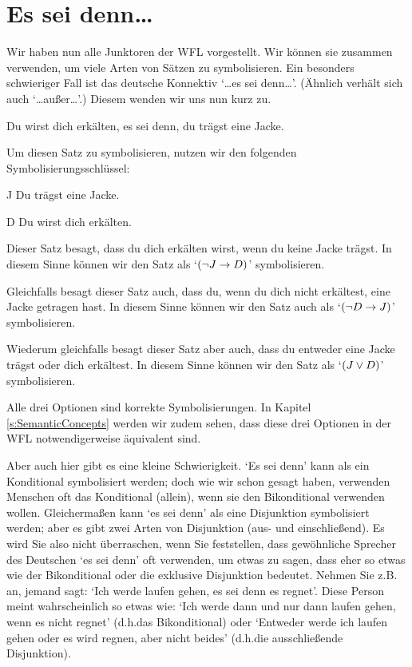 \section{Es sei denn\dots}
Wir haben nun alle Junktoren der WFL vorgestellt. Wir können sie zusammen verwenden, um viele Arten von Sätzen zu symbolisieren. Ein besonders schwieriger Fall ist das deutsche Konnektiv `\dots es sei denn\dots'. (Ähnlich verhält sich auch `\dots au{\ss}er\dots'.) Diesem wenden wir uns nun kurz zu. 

\begin{earg}
\item[\ex{unless1}] Du wirst dich erkälten, es sei denn, du trägst eine Jacke.
\end{earg}
Um diesen Satz zu symbolisieren, nutzen wir den folgenden Symbolisierungsschlüssel:
	\begin{ekey}
		\item[J] Du trägst eine Jacke.
		\item[D] Du wirst dich erkälten.
	\end{ekey}
Dieser Satz besagt, dass du dich erkälten wirst, wenn du keine Jacke trägst. In diesem Sinne können wir den Satz als `$(\neg J \rightarrow D)$' symbolisieren. 

Gleichfalls besagt dieser Satz auch, dass du, wenn du dich nicht erkältest, eine Jacke getragen hast. In diesem Sinne können wir den Satz auch als `$(\neg D \rightarrow J)$' symbolisieren.

Wiederum gleichfalls besagt dieser Satz aber auch, dass du entweder eine Jacke trägst oder dich erkältest. In diesem Sinne können wir den Satz als `$(J \vee D)$' symbolisieren.

Alle drei Optionen sind korrekte Symbolisierungen. In Kapitel \ref{s:SemanticConcepts} werden wir zudem sehen, dass diese drei Optionen in der WFL notwendigerweise äquivalent sind.

Aber auch hier gibt es eine kleine Schwierigkeit. `Es sei denn' kann als ein Konditional symbolisiert werden; doch wie wir schon gesagt haben, verwenden Menschen oft das Konditional (allein), wenn sie den Bikonditional verwenden wollen. Gleicherma{\ss}en kann `es sei denn' als eine Disjunktion symbolisiert werden; aber es gibt zwei Arten von Disjunktion (aus- und einschlie{\ss}end). Es wird Sie also nicht überraschen, wenn Sie feststellen, dass gewöhnliche Sprecher des Deutschen `es sei denn' oft verwenden, um etwas zu sagen, dass eher so etwas wie der Bikonditional oder die exklusive Disjunktion bedeutet. Nehmen Sie z.B. an, jemand sagt: `Ich werde laufen gehen, es sei denn es regnet'. Diese Person meint wahrscheinlich so etwas wie: `Ich werde dann und nur dann laufen gehen, wenn es nicht regnet' (d.h.\@ das Bikonditional) oder `Entweder werde ich laufen gehen oder es wird regnen, aber nicht beides' (d.h.\@ die ausschlie{\ss}ende Disjunktion). 

